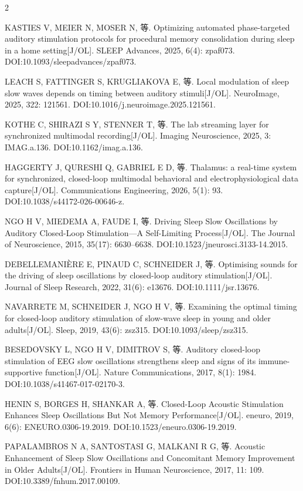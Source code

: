 \documentclass[UTF8,zihao=5,fontset=none]{ctexart}
\begin{document}
\begin{multicols}{2}
{\makebox[25.2pt][l]{[66]}KASTIES V, MEIER N, MOSER N, 等. Optimizing automated phase-targeted auditory stimulation protocols for procedural memory consolidation during sleep in a home setting[J/OL]. SLEEP Advances, 2025, 6(4): zpaf073. DOI:10.1093/sleepadvances/zpaf073.\par
\makebox[25.2pt][l]{[67]}LEACH S, FATTINGER S, KRUGLIAKOVA E, 等. Local modulation of sleep slow waves depends on timing between auditory stimuli[J/OL]. NeuroImage, 2025, 322: 121561. DOI:10.1016/j.neuroimage.2025.121561.\par
\makebox[25.2pt][l]{[68]}KOTHE C, SHIRAZI S Y, STENNER T, 等. The lab streaming layer for synchronized multimodal recording[J/OL]. Imaging Neuroscience, 2025, 3: IMAG.a.136. DOI:10.1162/imag.a.136.\par
\makebox[25.2pt][l]{[69]}HAGGERTY J, QURESHI Q, GABRIEL E D, 等. Thalamus: a real-time system for synchronized, closed-loop multimodal behavioral and electrophysiological data capture[J/OL]. Communications Engineering, 2026, 5(1): 93. DOI:10.1038/s44172-026-00646-z.\par
\makebox[25.2pt][l]{[70]}NGO H V, MIEDEMA A, FAUDE I, 等. Driving Sleep Slow Oscillations by Auditory Closed-Loop Stimulation—A Self-Limiting Process[J/OL]. The Journal of Neuroscience, 2015, 35(17): 6630--6638. DOI:10.1523/jneurosci.3133-14.2015.\par
\makebox[25.2pt][l]{[71]}DEBELLEMANIÈRE E, PINAUD C, SCHNEIDER J, 等. Optimising sounds for the driving of sleep oscillations by closed-loop auditory stimulation[J/OL]. Journal of Sleep Research, 2022, 31(6): e13676. DOI:10.1111/jsr.13676.\par
\makebox[25.2pt][l]{[72]}NAVARRETE M, SCHNEIDER J, NGO H V, 等. Examining the optimal timing for closed-loop auditory stimulation of slow-wave sleep in young and older adults[J/OL]. Sleep, 2019, 43(6): zsz315. DOI:10.1093/sleep/zsz315.\par
\makebox[25.2pt][l]{[73]}BESEDOVSKY L, NGO H V, DIMITROV S, 等. Auditory closed-loop stimulation of EEG slow oscillations strengthens sleep and signs of its immune-supportive function[J/OL]. Nature Communications, 2017, 8(1): 1984. DOI:10.1038/s41467-017-02170-3.\par
\makebox[25.2pt][l]{[74]}HENIN S, BORGES H, SHANKAR A, 等. Closed-Loop Acoustic Stimulation Enhances Sleep Oscillations But Not Memory Performance[J/OL]. eneuro, 2019, 6(6): ENEURO.0306-19.2019. DOI:10.1523/eneuro.0306-19.2019.\par
\makebox[25.2pt][l]{[75]}PAPALAMBROS N A, SANTOSTASI G, MALKANI R G, 等. Acoustic Enhancement of Sleep Slow Oscillations and Concomitant Memory Improvement in Older Adults[J/OL]. Frontiers in Human Neuroscience, 2017, 11: 109. DOI:10.3389/fnhum.2017.00109.\par
}
\end{multicols}
\end{document}
